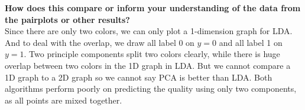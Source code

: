 \documentclass[12pt]{article}
\begin{document}
\begin{figure}[H]
\captionsetup[subfigure]{labelformat=empty}
\centering
{}
\end{figure}
\noindent
\textbf{How does this compare or inform your understanding of the data from the pairplots or other results?}\\
Since there are only two colors, we can only plot a 1-dimension graph for LDA. And to deal with the overlap, we draw all label 0 on $y=0$ and all label 1 on $y=1$. Two principle components split two colors clearly, while there is huge overlap between two colors in the 1D graph in LDA. But we cannot compare a 1D graph to a 2D graph so we cannot say PCA is better than LDA. Both algorithms perform poorly on predicting the quality using only two components, as all points are mixed together.
\end{document}
